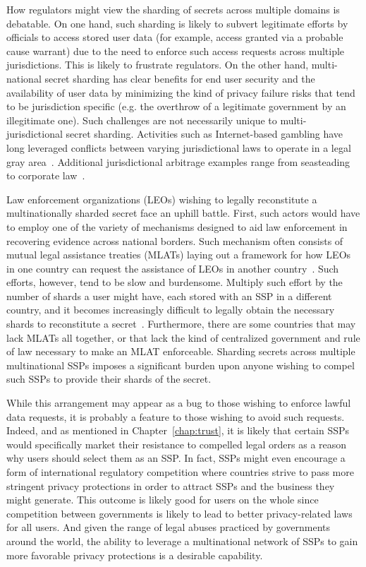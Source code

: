 How regulators might view the sharding of secrets across multiple
domains is debatable. On one hand, such sharding is likely to subvert
legitimate efforts by officials to access stored user data (for
example, access granted via a probable cause warrant) due to the need
to enforce such access requests across multiple jurisdictions. This is
likely to frustrate regulators. On the other hand, multi-national
secret sharding has clear benefits for end user security and the
availability of user data by minimizing the kind of privacy failure
risks that tend to be jurisdiction specific (e.g.  the overthrow of a
legitimate government by an illegitimate one). Such challenges are not
necessarily unique to multi-jurisdictional secret sharding. Activities
such as Internet-based gambling have long leveraged conflicts between
varying jurisdictional laws to operate in a legal gray
area~\cite{miller2006}. Additional jurisdictional arbitrage examples
range from seasteading~\cite{balloun2012} to corporate
law~\cite{kocaoglu2008}.

Law enforcement organizations (LEOs) wishing to legally reconstitute a
multinationally sharded secret face an uphill battle. First, such
actors would have to employ one of the variety of mechanisms designed
to aid law enforcement in recovering evidence across national
borders. Such mechanism often consists of mutual legal assistance
treaties (MLATs) laying out a framework for how LEOs in one country
can request the assistance of LEOs in another
country~\cite{stigall2013, walden2011}. Such efforts, however, tend to
be slow and burdensome. Multiply such effort by the number of shards a
user might have, each stored with an SSP in a different country, and
it becomes increasingly difficult to legally obtain the necessary
shards to reconstitute a secret~\cite{kent2015}. Furthermore, there
are some countries that may lack MLATs all together, or that lack the
kind of centralized government and rule of law necessary to make an
MLAT enforceable. Sharding secrets across multiple multinational SSPs
imposes a significant burden upon anyone wishing to compel such SSPs
to provide their shards of the secret.

While this arrangement may appear as a bug to those wishing to enforce
lawful data requests, it is probably a feature to those wishing to
avoid such requests. Indeed, and as mentioned in
Chapter~\ref{chap:trust}, it is likely that certain SSPs would
specifically market their resistance to compelled legal orders as a
reason why users should select them as an SSP. In fact, SSPs might
even encourage a form of international regulatory competition where
countries strive to pass more stringent privacy protections in order
to attract SSPs and the business they might generate. This outcome is
likely good for users on the whole since competition between
governments is likely to lead to better privacy-related laws for all
users. And given the range of legal abuses practiced by governments
around the world, the ability to leverage a multinational network of
SSPs to gain more favorable privacy protections is a desirable
capability.

